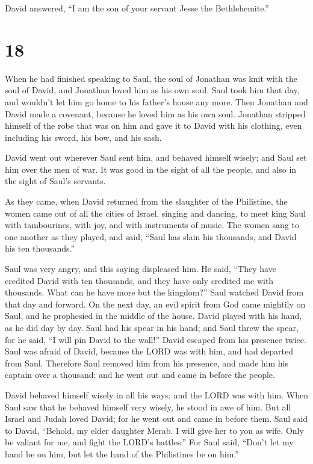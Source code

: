 David answered, ``I am the son of your servant Jesse the Bethlehemite.''

\hypertarget{section-17}{%
\section{18}\label{section-17}}

 When he had finished speaking to Saul, the soul of
Jonathan was knit with the soul of David, and Jonathan loved him as his
own soul.  Saul took him that day, and wouldn't let him go
home to his father's house any more.  Then Jonathan and
David made a covenant, because he loved him as his own soul.
 Jonathan stripped himself of the robe that was on him and
gave it to David with his clothing, even including his sword, his bow,
and his sash.

 David went out wherever Saul sent him, and behaved
himself wisely; and Saul set him over the men of war. It was good in the
sight of all the people, and also in the sight of Saul's servants.

 As they came, when David returned from the slaughter of
the Philistine, the women came out of all the cities of Israel, singing
and dancing, to meet king Saul with tambourines, with joy, and with
instruments of music.  The women sang to one another as
they played, and said, ``Saul has slain his thousands, and David his ten
thousands.''

 Saul was very angry, and this saying displeased him. He
said, ``They have credited David with ten thousands, and they have only
credited me with thousands. What can he have more but the kingdom?''
 Saul watched David from that day and forward.
 On the next day, an evil spirit from God came mightily
on Saul, and he prophesied in the middle of the house. David played with
his hand, as he did day by day. Saul had his spear in his hand;
 and Saul threw the spear, for he said, ``I will pin
David to the wall!'' David escaped from his presence twice.
 Saul was afraid of David, because the LORD was with him,
and had departed from Saul.  Therefore Saul removed him
from his presence, and made him his captain over a thousand; and he went
out and came in before the people.

 David behaved himself wisely in all his ways; and the
LORD was with him.  When Saul saw that he behaved himself
very wisely, he stood in awe of him.  But all Israel and
Judah loved David; for he went out and came in before them.
 Saul said to David, ``Behold, my elder daughter Merab. I
will give her to you as wife. Only be valiant for me, and fight the
LORD's battles.'' For Saul said, ``Don't let my hand be on him, but let
the hand of the Philistines be on him.''

